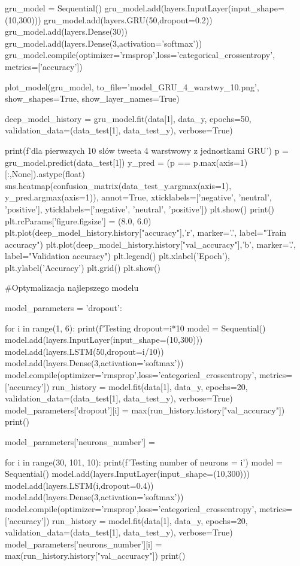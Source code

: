 \documentclass[11pt, a4paper, notitlepage]{report}
\begin{document}
\begin{appendices}
\begin{spverbatim}
gru_model = Sequential()
gru_model.add(layers.InputLayer(input_shape=(10,300)))
gru_model.add(layers.GRU(50,dropout=0.2))
gru_model.add(layers.Dense(30))
gru_model.add(layers.Dense(3,activation='softmax'))
gru_model.compile(optimizer='rmsprop',loss='categorical_crossentropy', metrics=['accuracy'])

plot_model(gru_model, to_file='model_GRU_4_warstwy_10.png', show_shapes=True, show_layer_names=True)

deep_model_history = gru_model.fit(data[1], data_y, epochs=50, validation_data=(data_test[1], data_test_y), verbose=True)

print(f'\nModel dla pierwszych 10 słów tweeta 4 warstwowy z jednostkami GRU\n')
p = gru_model.predict(data_test[1])
y_pred = (p == p.max(axis=1)[:,None]).astype(float)
sns.heatmap(confusion_matrix(data_test_y.argmax(axis=1), y_pred.argmax(axis=1)), annot=True, xticklabels=['negative', 'neutral', 'positive'], yticklabels=['negative', 'neutral', 'positive'])
plt.show()
print()
plt.rcParams['figure.figsize'] = (8.0, 6.0)
plt.plot(deep_model_history.history["accuracy"],'r', marker='.', label="Train accuracy")
plt.plot(deep_model_history.history["val_accuracy"],'b', marker='.', label="Validation accuracy")
plt.legend()
plt.xlabel('Epoch'), plt.ylabel('Accuracy')
plt.grid()
plt.show()

#Optymalizacja najlepszego modelu

model_parameters = {'dropout':{}}

for i in range(1, 6):
  print(f'Testing dropout={i*10}%
  model = Sequential()
  model.add(layers.InputLayer(input_shape=(10,300)))
  model.add(layers.LSTM(50,dropout=i/10))
  model.add(layers.Dense(3,activation='softmax'))
  model.compile(optimizer='rmsprop',loss='categorical_crossentropy', metrics=['accuracy'])
  run_history = model.fit(data[1], data_y, epochs=20, validation_data=(data_test[1], data_test_y), verbose=True)
  model_parameters['dropout'][i] = max(run_history.history["val_accuracy"])
  print()

model_parameters['neurons_number'] = {}

for i in range(30, 101, 10):
  print(f'Testing number of neurons = {i}')
  model = Sequential()
  model.add(layers.InputLayer(input_shape=(10,300)))
  model.add(layers.LSTM(i,dropout=0.4))
  model.add(layers.Dense(3,activation='softmax'))
  model.compile(optimizer='rmsprop',loss='categorical_crossentropy', metrics=['accuracy'])
  run_history = model.fit(data[1], data_y, epochs=20, validation_data=(data_test[1], data_test_y), verbose=True)
  model_parameters['neurons_number'][i] = max(run_history.history["val_accuracy"])
  print()


\end{spverbatim}
\end{appendices}
\end{document}
